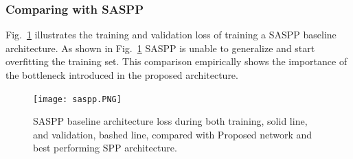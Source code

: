 \subsubsection{Comparing with SASPP}
Fig.~\ref{saspp} illustrates the training and validation loss of training a SASPP baseline architecture. As shown in Fig.~\ref{saspp} SASPP is unable to generalize and start overfitting the training set. This comparison empirically shows the importance of the bottleneck introduced in the proposed architecture.

\begin{center}
\begin{figure}[htbp]
\centerline{\texttt{[image: saspp.PNG]}}
\caption{SASPP baseline architecture loss during both training, solid line, and validation, bashed line, compared with Proposed network and best performing SPP architecture.}
\label{saspp}
\end{figure}
\end{center}

